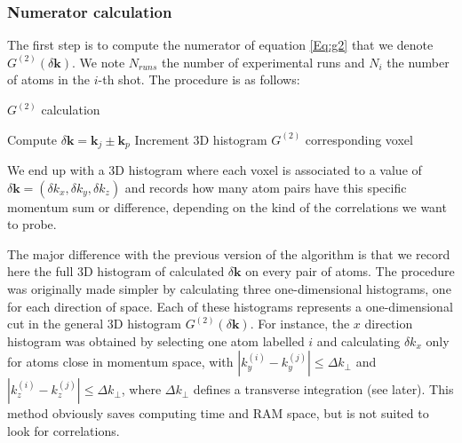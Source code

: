 \subsubsection{Numerator calculation}

The first step is to compute the numerator of equation \ref{Eq:g2} that we denote $G^{(2)}(\delta \bm{k})$. We note $N_{runs}$ the number of experimental runs and $N_{i}$ the number of atoms in the $i$-th shot. The procedure is as follows:


\begin{algorithm}
 \caption{$G^{(2)}$ calculation}
    \begin{algorithmic}
                    \State Compute $\delta \bm{k} = \bm{k}_j \pm \bm{k}_p$
                    \State Increment 3D histogram $G^{(2)}$ corresponding voxel
                \EndFor
            \EndFor
        \EndFor
\end{algorithmic}

\end{algorithm}

We end up with a 3D histogram where each voxel is associated to a value of $\delta \bm{k} = (\delta k_x,\delta k_y, \delta k_z)$ and records how many atom pairs have this specific momentum sum or difference, depending on the kind of the correlations we want to probe.

The major difference with the previous version of the algorithm is that we record here the full 3D histogram of calculated $\delta \bm{k}$ on every pair of atoms. The procedure was originally made simpler by calculating three one-dimensional histograms, one for each direction of space. Each of these histograms represents a one-dimensional cut in the general 3D histogram $G^{(2)}(\delta \bm{k})$. For instance, the $x$ direction histogram was obtained by selecting one atom labelled $i$ and calculating $\delta k_x$ only for atoms close in momentum space, \ie with $|k_y^{(i)}-k_y^{(j)}| \leq \Delta k_{\perp}$ and $|k_z^{(i)}-k_z^{(j)}| \leq \Delta k_{\perp}$, where $\Delta k_{\perp}$ defines a transverse integration (see later). This method obviously saves computing time and RAM space, but is not suited to look for \kmk correlations.

